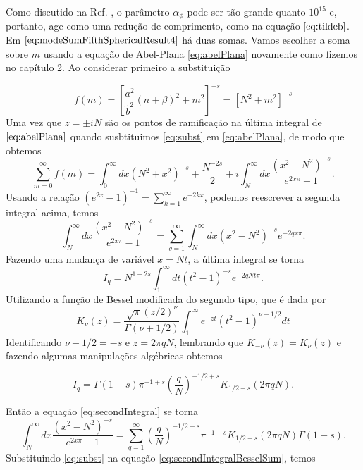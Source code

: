 Como discutido na Ref. \cite{CarrollTam2008}, o parâmetro $\alpha_\phi$ pode ser tão grande quanto $10^{15}$ e, portanto, age como uma redução de comprimento, como na equação $\eqref{eq:tildeb}$. Em $\eqref{eq:modeSumFifthSphericalResult4}$ há duas somas. Vamos escolher a soma sobre $m$ usando a equação de Abel-Plana \eqref{eq:abelPlana} novamente como fizemos no capítulo 2. Ao considerar primeiro a substituição

\begin{equation}
    f(m) = \left[ \frac{a^2}{\tilde{b}^2} (n + \beta)^2 + m^2 \right]^{-s} = [N^2 + m^2]^{-s} \label{eq:subst}
\end{equation}
Uma vez que $z=\pm iN$ são os pontos de ramificação na última integral de $\eqref{eq:abelPlana}$ quando susbtituimos \eqref{eq:subst} em \eqref{eq:abelPlana}, de modo que obtemos 
\begin{equation}
    \sum_{m=0}^\infty f(m) = \int_0^\infty dx(N^2 + x^2)^{-s} + \frac{N^{-2s}}{2} + i \int_N^\infty dx \frac{(x^2 - N^2)^{-s}}{e^{2x\pi} - 1}. \label{eq:abelPlanaSubst}
\end{equation}
Usando a relação $(e^{2x} - 1)^{-1} = \sum_{k=1}^\infty e^{-2kx}$, podemos reescrever a segunda integral acima, temos
\begin{equation}
    \int_N^\infty dx \frac{(x^2 - N^2)^{-s}}{e^{2x\pi} - 1} = \sum_{q=1}^\infty \int_N^\infty dx (x^2 - N^2)^{-s} e^{-2q x\pi}.  \label{eq:secondIntegral}
\end{equation}
Fazendo uma mudança de variável $x=Nt$, a última integral se torna
\begin{equation}
    I_q = N^{1-2s} \int_1^\infty dt (t^2 - 1)^{-s} e^{-2q N t \pi}. \label{eq:secondIntegralSubst}
\end{equation}
Utilizando a função de Bessel modificada do segundo tipo, que é dada por
\begin{equation}
    K_\nu(z) = \frac{\sqrt{\pi}(z/2)^\nu}{\Gamma(\nu+1/2)} \int_1^\infty  e^{-zt} (t^2 - 1)^{\nu - 1/2} dt \label{eq:besselK}
\end{equation}
Identificando $\nu - 1/2 = - s$ e $z = 2\pi qN$, lembrando que $K_{-\nu} (z) = K_\nu (z)$ e fazendo algumas manipulações algébricas obtemos

\begin{equation}
    I_q = \Gamma(1-s) \pi^{-1+s} \left( \frac{q}{N} \right)^{-1/2 + s} K_{1/2-s}(2\pi qN) . \label{eq:secondIntegralBessel}
\end{equation}

Então a equação \eqref{eq:secondIntegral} se torna
\begin{equation}
    \int_N^\infty dx \frac{(x^2 - N^2)^{-s}}{e^{2x\pi} - 1} = \sum_{q=1}^\infty \left( \frac{q}{N} \right)^{-1/2 + s} \pi^{-1+s} K_{1/2-s}(2\pi qN) \Gamma(1-s). \label{eq:secondIntegralBesselSum}
\end{equation}
Substituindo \eqref{eq:subst} na equação \eqref{eq:secondIntegralBesselSum}, temos

